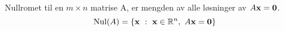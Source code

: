Nullromet til en $m\times n$ matrise A,
er mengden av alle løsninger av $A\mathbf{x} = \mathbf{0}$.
$$\Nul{A} = \{ \vecx\ :\ \vecx\in\mathbb{R}^n,\ A\vecx=\vecO \}$$
